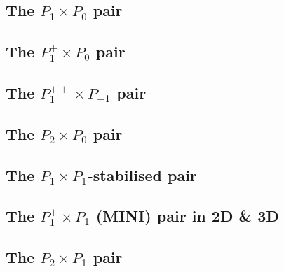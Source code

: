

\subsection{The $P_1\times P_0$ pair} \label{ss:p1p0}


\subsection{The $P_1^+\times P_0$ pair} \label{ss:p1pp0}


\subsection{The ${ P}_1^{++}\times P_{-1}$ pair} \label{ss:p1ppp1}


\subsection{The ${ P}_2\times P_0$ pair} \label{ss:p2p0}


\subsection{The ${ P}_1\times P_1$-stabilised pair} \label{ss:P1P1stab}


\subsection{The ${ P}_1^+\times P_1$ (MINI) pair in 2D \& 3D \label{pair:mini}}


\subsection{The ${ P}_2\times P_1$ pair \label{ss:p2p1}}


